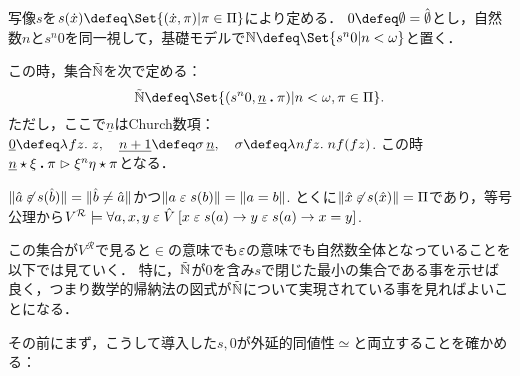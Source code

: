 \documentclass[realisability.tex]{subfiles}
\begin{document}
\begin{definition}
 写像$s$を$s(\dot{x}) \defeq \Set{ (\dot{x}, \pi) | \pi \in \Pi}$により定める．
 $0 \defeq \emptyset = \hat{\emptyset}$とし，自然数$n$と$s^n 0$を同一視して，基礎モデルで$\mathbb{N} \defeq \Set{ s^n 0 | n < \omega}$と置く．

 この時，集合$\mathord{\tilde{\mathbb{N}}}$を次で定める：
 \[
  \NN \defeq \Set{ (s^n 0, \num{n} \push \pi) | n < \omega, \pi \in \Pi}.
 \]
 ただし，ここで$\underline{n}$はChurch数項：$\underline{0} \defeq \abs{f z}{z}, \quad \underline{n+1} \defeq \sigma \, \underline{n}, \quad \sigma \defeq \abs{n f z}{n f (f z)}$.
 この時$\underline{n} \mathbin{\star} \xi \mathbin{\boldsymbol{.}} \pi \mathrel{\rhd} \xi^n \eta \mathbin{\star} \pi$となる．
\end{definition}
\begin{remark}
 $\|\hat{a} \not\mathrel{\varepsilon} s(\hat{b})\| = \|\hat{b} \neq \hat{a}\|$かつ$\|a \mathrel{\varepsilon} s(b)\| = \|a = b\|$.
 とくに$\|\hat{x} \not\mathrel{\varepsilon} s(\hat{x})\| = \Pi$であり，等号公理から$V^{\mathcal{R}} \models \forall a, x, y \mathrel{\varepsilon} \hat{V} \: [x \mathrel{\varepsilon} s(a) \to y \mathrel{\varepsilon} s(a) \to x = y]$.
\end{remark}

この集合が$V^{\mathcal{R}}$で見ると$\in$の意味でも$\mathrel{\varepsilon}$の意味でも自然数全体となっていることを以下では見ていく．
特に，$\mathord{\tilde{\mathbb{N}}}$が$0$を含み$s$で閉じた最小の集合である事を示せば良く，つまり数学的帰納法の図式が$\mathord{\tilde{\mathbb{N}}}$について実現されている事を見ればよいことになる．

その前にまず，こうして導入した$s, 0$が外延的同値性$\simeq$と両立することを確かめる：
\end{document}
